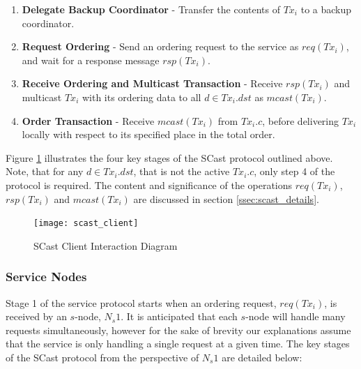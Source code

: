     \begin{enumerate}[label=\bfseries C\arabic*]
        \item    \textbf{Delegate Backup Coordinator} - Transfer the contents of $Tx_i$ to a backup coordinator.    
        
        \item    \textbf{Request Ordering} - Send an ordering request to the service as $req(Tx_i)$, and wait for a response message $rsp(Tx_i)$.  
        
        \item    \textbf{Receive Ordering and Multicast Transaction} - Receive $rsp(Tx_i)$ and multicast $Tx_i$ with its ordering data to all $d \in Tx_i.dst$ as $mcast(Tx_i)$.  
        
        \item    \textbf{Order Transaction} - Receive $mcast(Tx_i)$ from $Tx_i.c$, before delivering $Tx_i$ locally with respect to its specified place in the total order.   
    \end{enumerate}
    
    Figure \ref{fig:scast_client} illustrates the four key stages of the \textsf{SCast} protocol outlined above.  Note, that for any $d \in Tx_i.dst$, that is not the active $Tx_i.c$, only step 4 of the protocol is required.  The content and significance of the operations $req(Tx_i)$, $rsp(Tx_i)$ and $mcast(Tx_i)$ are discussed in section \ref{ssec:scast_details}.  

    \begin{figure}[htbp!] 
        \centering    
         \texttt{[image: scast\_client]}
         \caption[SCast Client Interactions]{SCast Client Interaction Diagram}
         \label{fig:scast_client}
    \end{figure}	
    
    
    \subsubsection*{Service Nodes}
    Stage 1 of the service protocol starts when an ordering request, $req(Tx_i)$, is received by an $s$-node, $N_s1$.  It is anticipated that each $s$-node will handle many requests simultaneously, however for the sake of brevity our explanations assume that the service is only handling a single request at a given time.  The key stages of the \textsf{SCast} protocol from the perspective of $N_s1$ are detailed below:
    
